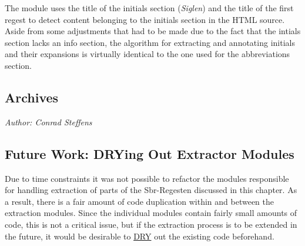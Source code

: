 The \texttt{} module uses the title of the initials section
(\emph{Siglen}) and the title of the first regest to detect content
belonging to the initials section in the HTML source. Aside from some
adjustments that had to be made due to the fact that the intials
section lacks an info section, the algorithm for extracting and
annotating initials and their expansions is virtually identical to the
one used for the abbreviations section.

\subsection{Archives}
\label{sec:archives}

\emph{Author: Conrad Steffens} \\

\subsection{Future Work: DRYing Out Extractor Modules}
\label{sec:future-work-other}

Due to time constraints it was not possible to refactor the modules
responsible for handling extraction of parts of the Sbr-Regesten
discussed in this chapter. As a result, there is a fair amount of code
duplication within and between the extraction modules. Since the
individual modules contain fairly small amounts of code, this is not a
critical issue, but if the extraction process is to be extended in the
future, it would be desirable to
\href{https://en.wikipedia.org/wiki/Don't_repeat_yourself}{DRY} out
the existing code beforehand.
